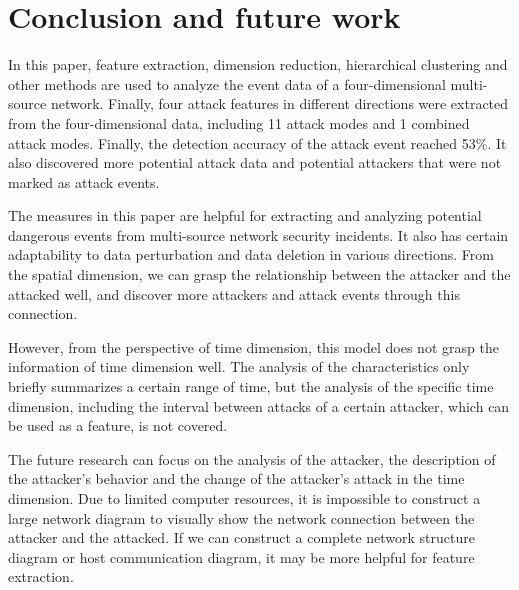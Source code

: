 \documentclass[12pt,journal,draftcls,doublespace, letterpaper,onecolumn]{IEEEtran}
\begin{document}
\section{Conclusion and future work}
In this paper, feature extraction, dimension reduction, hierarchical clustering and other methods are used to analyze the event data of a four-dimensional multi-source network. Finally, four attack features in different directions were extracted from the four-dimensional data, including 11 attack modes and 1 combined attack modes. Finally, the detection accuracy of the attack event reached 53\%. It also discovered more potential attack data and potential attackers that were not marked as attack events.

The measures in this paper are helpful for extracting and analyzing potential dangerous events from multi-source network security incidents. It also has certain adaptability to data perturbation and data deletion in various directions. From the spatial dimension, we can grasp the relationship between the attacker and the attacked well, and discover more attackers and attack events through this connection.

However, from the perspective of time dimension, this model does not grasp the information of time dimension well. The analysis of the characteristics only briefly summarizes a certain range of time, but the analysis of the specific time dimension, including the interval between attacks of a certain attacker, which can be used as a feature, is not covered.

The future research can focus on the analysis of the attacker, the description of the attacker's behavior and the change of the attacker's attack in the time dimension. Due to limited computer resources, it is impossible to construct a large network diagram to visually show the network connection between the attacker and the attacked. If we can construct a complete network structure diagram or host communication diagram, it may be more helpful for feature extraction.
\end{document}
